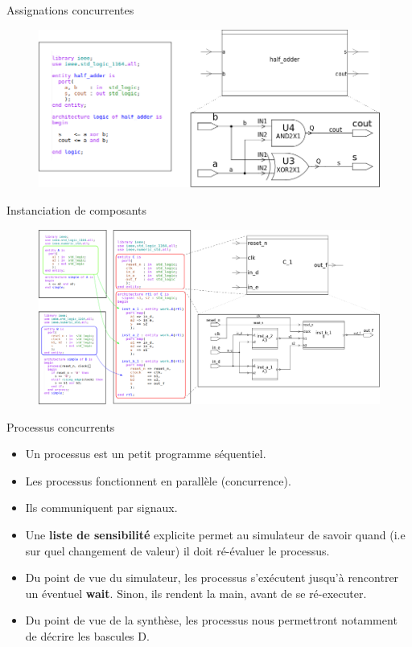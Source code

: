 \documentclass[xcolor=table]{beamer} %
\begin{document}
\begin{frame}{Assignations concurrentes}
  \begin{figure}[h]
    \centering
    \includegraphics[scale=0.35]{./figures/assignations_concurrentes.png}
  \end{figure}
\end{frame}

\begin{frame}{Instanciation de composants}
  \begin{figure}[h]
    \centering
    \includegraphics[scale=0.17]{./figures/instanciation.png}
  \end{figure}
\end{frame}

\begin{frame}{Processus concurrents}
  \begin{itemize}
    \item Un processus est un petit programme séquentiel.
    \item Les processus fonctionnent en parallèle (concurrence).
    \item Ils communiquent par signaux.
    \item Une \textbf{liste de sensibilité} explicite permet au simulateur de savoir quand (i.e sur quel changement de valeur) il doit
    ré-évaluer le processus.
    \item Du point de vue du simulateur, les processus s'exécutent jusqu'à rencontrer un éventuel \textbf{wait}. Sinon, ils rendent la main, avant de se ré-executer.
    \item Du point de vue de la synthèse, les processus nous permettront notamment de décrire les bascules D.
  \end{itemize}
\end{frame}
\end{document}
